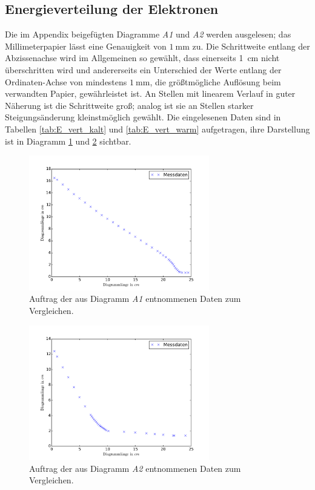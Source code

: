 \subsection{Energieverteilung der Elektronen} %
\label{sec:energiespektren}
Die im Appendix beigefügten Diagramme \emph{A1} und \emph{A2} werden ausgelesen;
das Millimeterpapier lässt eine Genauigkeit von $\SI{1}{\milli\meter}$ zu.
Die Schrittweite entlang der Abzissenachse wird im Allgemeinen so gewählt, dass einerseits \SI{1}{\centi\meter} nicht überschritten wird und 
andererseits ein Unterschied der Werte entlang der Ordinaten-Achse von mindestens $\SI{1}{\milli\meter}$, die größtmögliche Auflösung beim verwandten Papier, gewährleistet ist.
An Stellen mit linearem Verlauf in guter Näherung ist die Schrittweite groß; 
analog ist sie an Stellen starker Steigungsänderung kleinstmöglich gewählt.
Die eingelesenen Daten sind in Tabellen \ref{tab:E_vert_kalt} und \ref{tab:E_vert_warm} aufgetragen, ihre Darstellung ist in Diagramm \ref{fig:E_vert_kalt} und \ref{fig:E_vert_warm} sichtbar.
\begin{figure}[p]
	\centering
	\includegraphics[width=0.7\textwidth]{Bilder/Vert_kalt.pdf}
	\caption{Auftrag der aus Diagramm \emph{A1} entnommenen Daten zum Vergleichen.}
	\label{fig:E_vert_kalt}
\end{figure}
\begin{figure}[p]
	\centering
	\includegraphics[width=0.7\textwidth]{Bilder/Vert_warm.pdf}
	\caption{Auftrag der aus Diagramm \emph{A2} entnommenen Daten zum Vergleichen.}
	\label{fig:E_vert_warm}
\end{figure}
